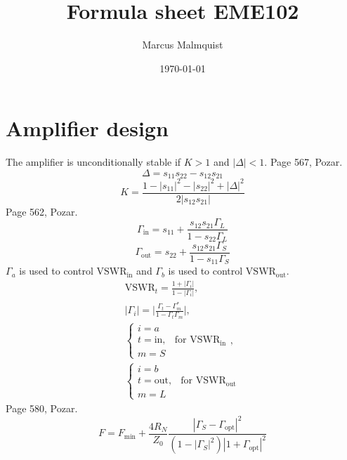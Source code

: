 \documentclass[12pt,a4paper]{article}
\title{Formula sheet EME102}
\author{Marcus Malmquist}
\date{\today}
\begin{document}
\maketitle

\section{Amplifier design}\label{sec:1}
The amplifier is unconditionally stable if $K>1$ and $|\Delta|<1$. Page 567, Pozar.
\begin{equation}
  \label{eq:delta}
  \Delta = s_{11}s_{22} - s_{12}s_{21}
\end{equation}
\begin{equation}
  \label{eq:k}
  K = \frac{1 - |s_{11}|^2 - |s_{22}|^2 + |\Delta|^2}{2|s_{12}s_{21}|}
\end{equation}
Page 562, Pozar.
\begin{equation}
  \label{eq:gma_in}
  \Gamma_\text{in} = s_{11} + \frac{s_{12}s_{21}\Gamma_L}{1 - s_{22}\Gamma_L}
\end{equation}
\begin{equation}
  \label{eq:gma_out}
  \Gamma_\text{out} = s_{22} + \frac{s_{12}s_{21}\Gamma_S}{1 - s_{11}\Gamma_S}
\end{equation}
$\Gamma_a$ is used to control $\text{VSWR}_\text{in}$ and $\Gamma_b$ is used to control $\text{VSWR}_\text{out}$.
\begin{subequations}
  \label{eq:gma_sys}
  \begin{align}
    \text{VSWR}_t=\frac{1+|\Gamma_i|}{1-|\Gamma_i|}, \\
    |\Gamma_i|=\bigg|\frac{\Gamma_t - \Gamma_m^*}{1 - \Gamma_t\Gamma_m}\bigg|, \\
    \begin{cases}
      i=a \\
      t=\text{in}, & \text{for $\text{VSWR}_\text{in}$} \\
      m=S
    \end{cases}, \\
    \begin{cases}
      i=b \\
      t=\text{out}, & \text{for $\text{VSWR}_\text{out}$} \\
      m=L
    \end{cases}
  \end{align}
\end{subequations}
Page 580, Pozar.
\begin{equation}
  \label{eq:noise}
  F=F_\text{min} + \frac{4R_N}{Z_0}\frac{|\Gamma_S-\Gamma_\text{opt}|^2}{(1-|\Gamma_S|^2)|1+\Gamma_\text{opt}|^2}
\end{equation}
\end{document}
